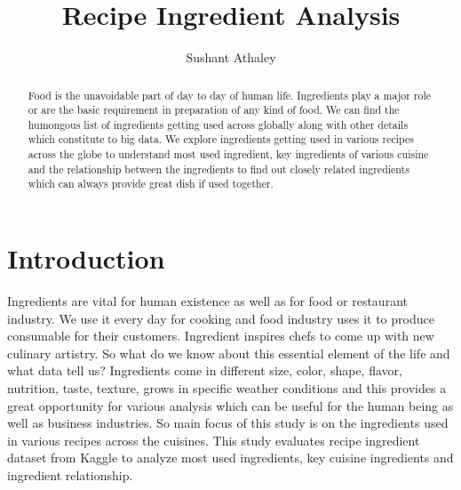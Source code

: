 \documentclass[sigconf]{acmart}
\begin{document}
\title{Recipe Ingredient Analysis}


\author{Sushant Athaley}

\renewcommand{\shortauthors}{G. v. Laszewski}


\begin{abstract}
Food is the unavoidable part of day to day of human life. Ingredients play a major role or are the basic requirement in preparation of any kind of food. We can find the humongous list of ingredients getting used across globally along with other details which constitute to big data. We explore ingredients getting used in various recipes across the globe to understand most used ingredient, key ingredients of various cuisine and the relationship between the ingredients to find out closely related ingredients which can always provide great dish if used together.
\end{abstract}


\maketitle

\section{Introduction}
Ingredients are vital for human existence as well as for food or restaurant industry. We use it every day for cooking and food industry uses it to produce consumable for their customers. Ingredient inspires chefs to come up with new culinary artistry. So what do we know about this essential element of the life and what data tell us? Ingredients come in different size, color, shape, flavor, nutrition, taste, texture, grows in specific weather conditions and this provides a great opportunity for various analysis which can be useful for the human being as well as business industries. So main focus of this study is on the ingredients used in various recipes across the cuisines. This study evaluates recipe ingredient dataset from Kaggle \cite{www-kaggle} to analyze most used ingredients, key cuisine ingredients and ingredient relationship.
\end{document}
